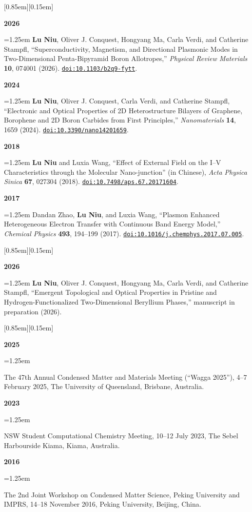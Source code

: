 \documentclass[12pt,a4paper]{article}
\newcommand{\cvtitlefont}{\ttfamily\bfseries}
\newcommand{\cvsection}[1]{%
    \vspace{1.00em}%
    \noindent
    \colorbox{subtitlecolor}{%
        \raisebox{0pt}[0.85em][0.15em]{%
            \makebox[\dimexpr\textwidth-2\fboxsep\relax][l]{%
                \textcolor{white}{\cvtitlefont\large\quad #1}%
            }%
        }%
    }%
    \par\vspace{1em}%
}
\newenvironment{cvbody}{%
    \begingroup
    \setlength{\leftskip}{1.25em}%
    \setlength{\rightskip}{0em}%
    \setlength{\parindent}{0em}%
    \setlength{\linewidth}{\dimexpr\textwidth-1.25em\relax}%
}{%
    \par\endgroup
}
\newcommand{\cvpublication}[1]{%
    \hangindent=1.25em\hangafter=1 #1\par\vspace{1em}%
}
\newcommand{\cvactivity}[2]{%
    \textbf{#1}\par
    \hangindent=1.25em
    \hangafter=1
    #2\par
    \vspace{0.5em}%
}
\begin{document}
\cvsection{Publications}
\begin{cvbody}

\textbf{2026}\par
\cvpublication{\textbf{Lu Niu}, Oliver J. Conquest, Hongyang Ma, Carla Verdi, and Catherine Stampfl, ``Superconductivity, Magnetism, and Directional Plasmonic Modes in Two-Dimensional Penta-Bipyramid Boron Allotropes,'' \emph{Physical Review Materials} \textbf{10}, 074001 (2026). \href{https://doi.org/10.1103/b2q9-fytt}{\nolinkurl{doi:10.1103/b2q9-fytt}}.}

\textbf{2024}\par
\cvpublication{\textbf{Lu Niu}, Oliver J. Conquest, Carla Verdi, and Catherine Stampfl, ``Electronic and Optical Properties of 2D Heterostructure Bilayers of Graphene, Borophene and 2D Boron Carbides from First Principles,'' \emph{Nanomaterials} \textbf{14}, 1659 (2024). \href{https://doi.org/10.3390/nano14201659}{\nolinkurl{doi:10.3390/nano14201659}}.}

\textbf{2018}\par
\cvpublication{\textbf{Lu Niu} and Luxia Wang, ``Effect of External Field on the I--V Characteristics through the Molecular Nano-junction'' (in Chinese), \emph{Acta Physica Sinica} \textbf{67}, 027304 (2018). \href{https://doi.org/10.7498/aps.67.20171604}{\nolinkurl{doi:10.7498/aps.67.20171604}}.}

\textbf{2017}\par
\cvpublication{Dandan Zhao, \textbf{Lu Niu}, and Luxia Wang, ``Plasmon Enhanced Heterogeneous Electron Transfer with Continuous Band Energy Model,'' \emph{Chemical Physics} \textbf{493}, 194--199 (2017). \href{https://doi.org/10.1016/j.chemphys.2017.07.005}{\nolinkurl{doi:10.1016/j.chemphys.2017.07.005}}.}

\end{cvbody}

\cvsection{Manuscript in Preparation}
\begin{cvbody}

\textbf{2026}\par
\cvpublication{\textbf{Lu Niu}, Oliver J. Conquest, Hongyang Ma, Carla Verdi, and Catherine Stampfl, ``Emergent Topological and Optical Properties in Pristine and Hydrogen-Functionalized Two-Dimensional Beryllium Phases,'' manuscript in preparation (2026).}

\end{cvbody}

\clearpage
\cvsection{Conferences and Academic Activities}
\begin{cvbody}

\cvactivity{2025}{
The 47th Annual Condensed Matter and Materials Meeting
(``Wagga 2025''),
4--7 February 2025,
The University of Queensland,
Brisbane,
Australia.
}

\cvactivity{2023}{
NSW Student Computational Chemistry Meeting,
10--12 July 2023,
The Sebel Harbourside Kiama,
Kiama,
Australia.
}

\cvactivity{2016}{
The 2nd Joint Workshop on Condensed Matter Science,
Peking University and IMPRS,
14--18 November 2016,
Peking University,
Beijing,
China.
}

\end{cvbody}
\end{document}
